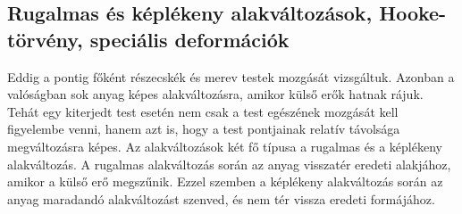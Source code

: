 \documentclass[a4paper,12pt]{article}
\begin{document}
\subsection{Rugalmas és képlékeny alakváltozások, Hooke-törvény, speciális deformációk}
Eddig a pontig főként részecskék és merev testek mozgását vizsgáltuk. Azonban a valóságban sok anyag képes alakváltozásra,
amikor külső erők hatnak rájuk. Tehát egy kiterjedt test esetén nem csak a test egészének mozgását kell figyelembe venni,
hanem azt is, hogy a test pontjainak relatív távolsága megváltozásra képes. Az alakváltozások két fő típusa a rugalmas és a képlékeny alakváltozás.
A rugalmas alakváltozás során az anyag visszatér eredeti alakjához, amikor a külső erő megszűnik.
Ezzel szemben a képlékeny alakváltozás során az anyag maradandó alakváltozást szenved, és nem tér vissza eredeti formájához.
\end{document}
